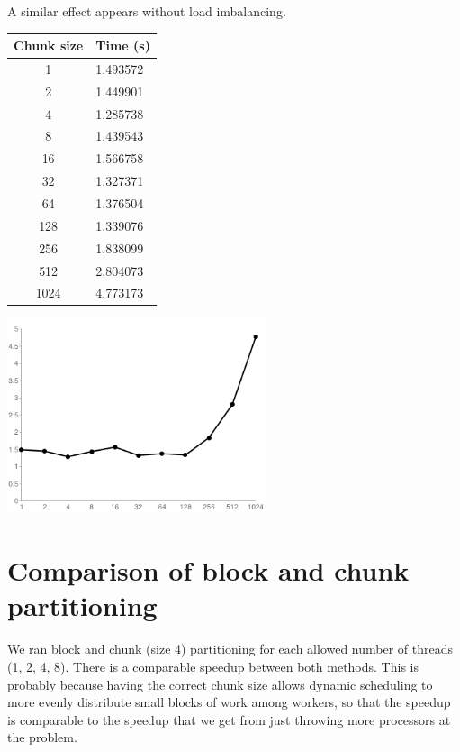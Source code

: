 \documentclass{article}[12pt;letterpaper]
\begin{document}
A similar effect appears without load imbalancing.

\begin{center}\begin{tabular}{c l}
Chunk size & Time (s) \\
\hline{}
   1 & 1.493572 \\
   2 & 1.449901 \\
   4 & 1.285738 \\
   8 & 1.439543 \\
  16 & 1.566758 \\
  32 & 1.327371 \\
  64 & 1.376504 \\
 128 & 1.339076 \\
 256 & 1.838099 \\
 512 & 2.804073 \\
1024 & 4.773173
\end{tabular}

\includegraphics[width=3in]{a2_sec2_2.png}
\end{center}

\section{Comparison of block and chunk partitioning}

We ran block and chunk (size 4) partitioning for each allowed number of threads
(1, 2, 4, 8). There is a comparable speedup between both methods. This is
probably because having the correct chunk size allows dynamic scheduling to
more evenly distribute small blocks of work among workers, so that the speedup
is comparable to the speedup that we get from just throwing more processors at
the problem.
\end{document}
